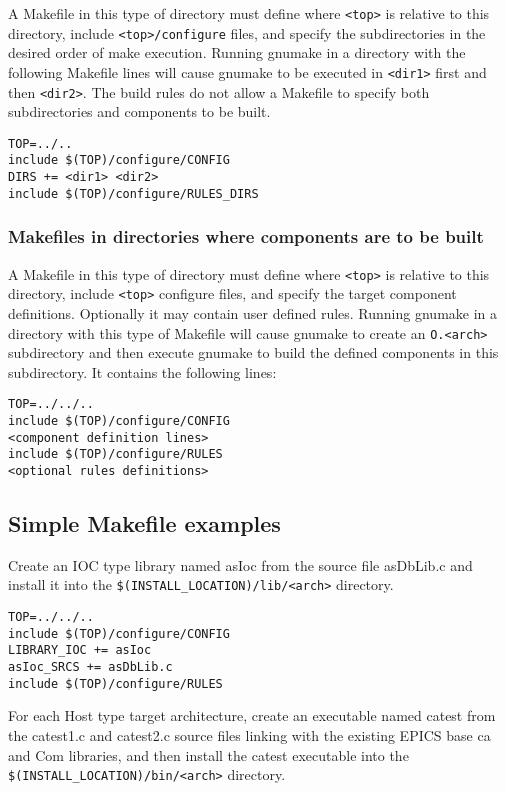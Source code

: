 A Makefile in this type of directory must define where \verb|<top>| is relative to this directory, include \verb|<top>/configure| files, 
and specify the subdirectories in the desired order of make execution. Running gnumake in a directory with the following 
Makefile lines will cause gnumake to be executed in \verb|<dir1>| first and then \verb|<dir2>|. The build rules do not allow a Makefile 
to specify both subdirectories and components to be built.

\begin{verbatim}
TOP=../..
include $(TOP)/configure/CONFIG
DIRS += <dir1> <dir2>
include $(TOP)/configure/RULES_DIRS

\end{verbatim}

\subsubsection{Makefiles in directories where components are to be built}

A Makefile in this type of directory must define where \verb|<top>| is relative to this directory, include \verb|<top>| configure files, 
and specify the target component definitions. Optionally it may contain user defined rules. Running gnumake in a 
directory with this type of Makefile will cause gnumake to create an \verb|O.<arch>| subdirectory and then execute gnumake to 
build the defined components in this subdirectory. It contains the following lines:

\begin{verbatim}
TOP=../../..
include $(TOP)/configure/CONFIG
<component definition lines>
include $(TOP)/configure/RULES
<optional rules definitions>
\end{verbatim}

\subsection{Simple Makefile examples}

Create an IOC type library named asIoc from the source file asDbLib.c and install it into the 
\verb|$(INSTALL_LOCATION)/lib/<arch>| directory.

\begin{verbatim}
TOP=../../..
include $(TOP)/configure/CONFIG
LIBRARY_IOC += asIoc
asIoc_SRCS += asDbLib.c
include $(TOP)/configure/RULES
\end{verbatim}

For each Host type target architecture, create an executable named catest from the catest1.c and catest2.c source files 
linking with the existing EPICS base ca and Com libraries, and then install the catest executable into the 
\verb|$(INSTALL_LOCATION)/bin/<arch>| directory.

